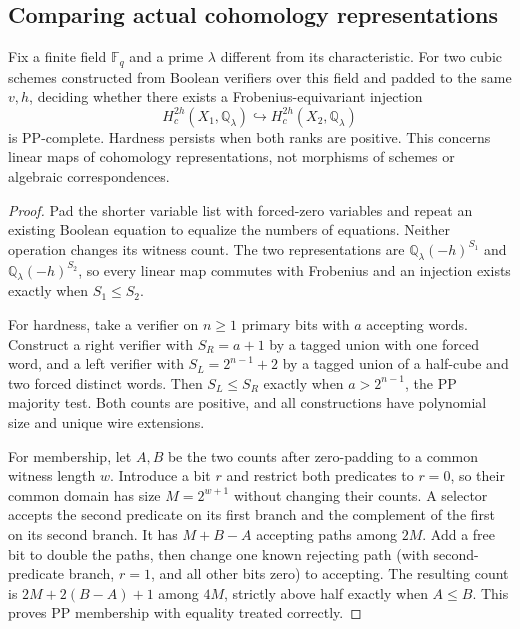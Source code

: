 \subsection{Comparing actual cohomology representations}
\begin{proposition}\label{prop:pp-tate}
Fix a finite field $\mathbb F_q$ and a prime $\lambda$ different from its characteristic. For two cubic schemes constructed from Boolean verifiers over this field and padded to the same $v,h$, deciding whether there exists a Frobenius-equivariant injection
\[
 H_c^{2h}(X_1,\mathbb Q_\lambda)\hookrightarrow
 H_c^{2h}(X_2,\mathbb Q_\lambda)
\]
is PP-complete. Hardness persists when both ranks are positive. This concerns linear maps of cohomology representations, not morphisms of schemes or algebraic correspondences.
\end{proposition}
\begin{proof}
Pad the shorter variable list with forced-zero variables and repeat an existing Boolean equation to equalize the numbers of equations. Neither operation changes its witness count. The two representations are $\mathbb Q_\lambda(-h)^{S_1}$ and $\mathbb Q_\lambda(-h)^{S_2}$, so every linear map commutes with Frobenius and an injection exists exactly when $S_1\leq S_2$.

For hardness, take a verifier on $n\geq1$ primary bits with $a$ accepting words. Construct a right verifier with $S_R=a+1$ by a tagged union with one forced word, and a left verifier with $S_L=2^{n-1}+2$ by a tagged union of a half-cube and two forced distinct words. Then $S_L\leq S_R$ exactly when $a>2^{n-1}$, the PP majority test. Both counts are positive, and all constructions have polynomial size and unique wire extensions.

For membership, let $A,B$ be the two counts after zero-padding to a common witness length $w$. Introduce a bit $r$ and restrict both predicates to $r=0$, so their common domain has size $M=2^{w+1}$ without changing their counts. A selector accepts the second predicate on its first branch and the complement of the first on its second branch. It has $M+B-A$ accepting paths among $2M$. Add a free bit to double the paths, then change one known rejecting path (with second-predicate branch, $r=1$, and all other bits zero) to accepting. The resulting count is $2M+2(B-A)+1$ among $4M$, strictly above half exactly when $A\leq B$. This proves PP membership with equality treated correctly.
\end{proof}

